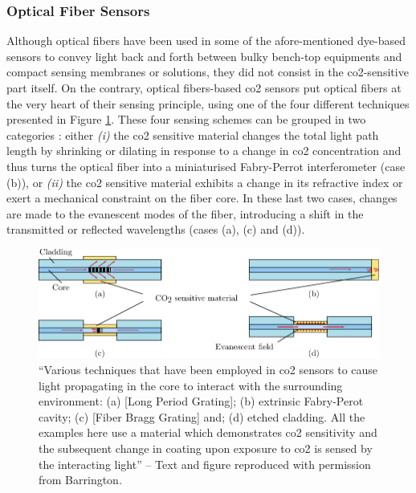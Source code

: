 \subsubsection{Optical Fiber Sensors}\label{subsect:choos:review:fibre_optic}

Although optical fibers have been used in some of the afore-mentioned dye-based sensors to convey light back and forth between bulky bench-top equipments and compact sensing membranes or solutions\cite{he1995, lu2008, degrandpre1999}, they did not consist in the \gls{co2}-sensitive part itself. On the contrary, optical fibers-based \gls{co2} sensors put optical fibers at the very heart of their sensing principle, using one of the four different techniques presented in Figure \ref{fig:choos:review:fibre_optic}. These four sensing schemes can be grouped in two categories : either \textit{(i)} the \gls{co2} sensitive material changes the total light path length by shrinking or dilating in response to a change in \gls{co2} concentration and thus turns the optical fiber into a miniaturised Fabry-Perrot interferometer (case (b)), or \textit{(ii)} the \gls{co2} sensitive material exhibits a change in its refractive index or exert a mechanical constraint on the fiber core. In these last two cases, changes are made to the evanescent modes of the fiber, introducing a shift in the transmitted or reflected wavelengths (cases (a), (c) and (d)).

\begin{figure}
	\centering
	\includegraphics{1_main_matter/choos_figures/review/fibre_optics_barrington}
	\caption[Fibre optic sensor variations.]{\enquote{Various techniques that have been employed in \gls{co2} sensors to cause light propagating in the core to interact with the surrounding environment: (a) [Long Period Grating]; (b) extrinsic Fabry-Perot cavity; (c) [Fiber Bragg Grating] and; (d) etched cladding. All the examples here use a material which demonstrates \gls{co2} sensitivity and the subsequent change in coating upon exposure to \gls{co2} is sensed by the interacting light} -- Text and figure reproduced with permission from Barrington\cite{barrington2018}.}
	\label{fig:choos:review:fibre_optic}
\end{figure}

